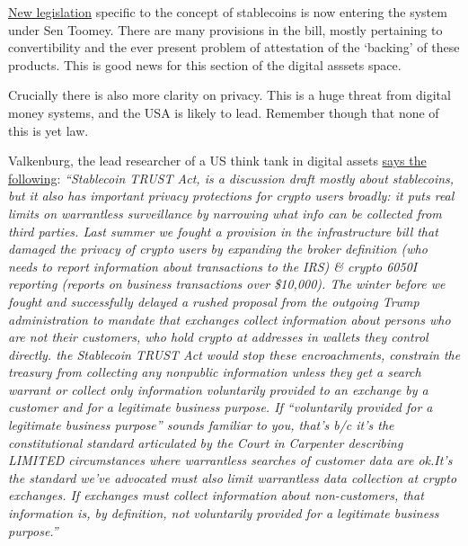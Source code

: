 \href{https://www.americanbanker.com/news/toomey-unveils-stablecoin-bill-granting-occ-authority-for-payments-charter}{New legislation} specific to the concept of stablecoins is now entering the system under Sen Toomey. There are many provisions in the bill, mostly pertaining to convertibility and the ever present problem of attestation of the `backing' of these products. This is good news for this section of the digital asssets space.\par
Crucially there is also more clarity on privacy. This is a huge threat from digital money systems, and the USA is likely to lead. Remember though that none of this is yet law.\par 
Valkenburg, the lead researcher of a US think tank in digital assets \href{https://twitter.com/valkenburgh/status/1511783339065237521}{says the following}: \textit{``Stablecoin TRUST Act, is a discussion draft mostly about stablecoins, but it also has important privacy protections for crypto users broadly: it puts real limits on warrantless surveillance by narrowing what info can be collected from third parties. Last summer we fought a provision in the infrastructure bill that damaged the privacy of crypto users by expanding the broker definition (who needs to report information about transactions to the IRS) \& crypto 6050I reporting (reports on business transactions over \$10,000). The winter before we fought and successfully delayed a rushed proposal from the outgoing Trump administration to mandate that exchanges collect information about persons who are not their customers, who hold crypto at addresses in wallets they control directly. the Stablecoin TRUST Act would stop these encroachments, constrain the treasury from collecting any nonpublic information unless they get a search warrant or collect only information voluntarily provided to an exchange by a customer and for a legitimate business purpose. If “voluntarily provided for a legitimate business purpose” sounds familiar to you, that’s b/c it's the constitutional standard articulated by the Court in Carpenter describing LIMITED circumstances where warrantless searches of customer data are ok.It’s the standard we’ve advocated must also limit warrantless data collection at crypto exchanges. If exchanges must collect information about non-customers, that information is, by definition, not voluntarily provided for a legitimate business purpose.''}




